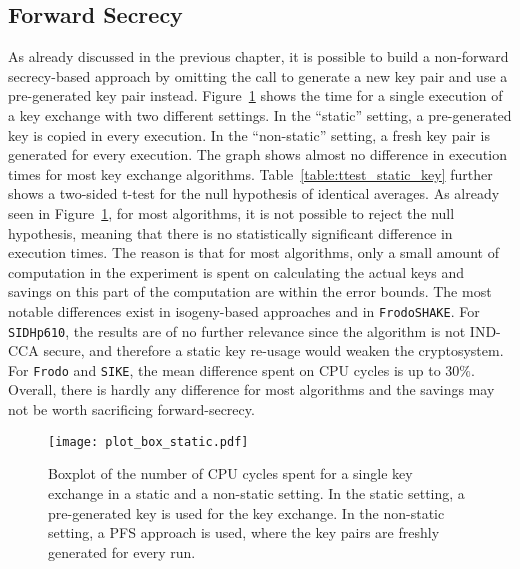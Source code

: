 \subsection{Forward Secrecy}
As already discussed in the previous chapter, it is possible to build a non-forward secrecy-based approach by omitting the call to generate a new key pair and use a pre-generated key pair instead. Figure~\ref{fig:plot_box_static.pdf} shows the time for a single execution of a key exchange with two different settings. In the ``static'' setting, a pre-generated key is copied in every execution. In the ``non-static'' setting, a fresh key pair is generated for every execution. The graph shows almost no difference in execution times for most key exchange algorithms. Table~\ref{table:ttest_static_key} further shows a two-sided t-test for the null hypothesis of identical averages. As already seen in Figure~\ref{fig:plot_box_static.pdf}, for most algorithms, it is not possible to reject the null hypothesis, meaning that there is no statistically significant difference in execution times. The reason is that for most algorithms, only a small amount of computation in the experiment is spent on calculating the actual keys and savings on this part of the computation are within the error bounds. The most notable differences exist in isogeny-based approaches and in \texttt{FrodoSHAKE}. For \texttt{SIDHp610}, the results are of no further relevance since the algorithm is not IND-CCA secure, and therefore a static key re-usage would weaken the cryptosystem. For \texttt{Frodo} and \texttt{SIKE}, the mean difference spent on \acs{CPU} cycles is up to \(30\%\). Overall, there is hardly any difference for most algorithms and the savings may not be worth sacrificing forward-secrecy.

\begin{figure}[t]
    \centering\texttt{[image: plot\_box\_static.pdf]}
    \caption{Boxplot of the number of CPU cycles spent for a single key exchange in a static and a non-static setting. In the static setting, a pre-generated key is used for the key exchange. In the non-static setting, a PFS approach is used, where the key pairs are freshly generated for every run.}\label{fig:plot_box_static.pdf}
\end{figure}

